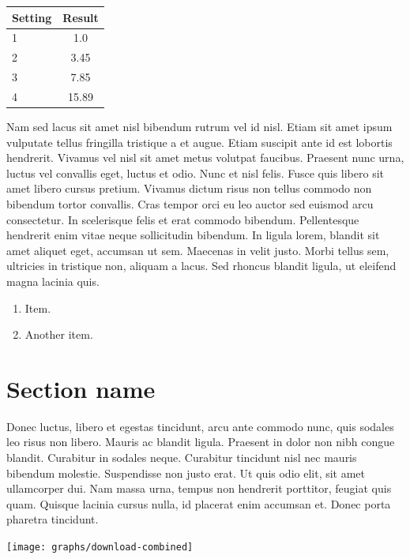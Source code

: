 \documentclass[11pt]{article}
\begin{document}
\vspace{0.5cm}
\begin{tabular}{lc}
  \toprule
  Setting & Result\\
  \midrule
  1 & 1.0\\
  2 & 3.45\\
  3 & 7.85\\
  4 & 15.89\\
  \bottomrule
\end{tabular}
\vspace{0.5cm}

Nam sed lacus sit amet nisl bibendum rutrum vel id nisl. Etiam sit
amet ipsum vulputate tellus fringilla tristique a et augue. Etiam
suscipit ante id est lobortis hendrerit. Vivamus vel nisl sit amet
metus volutpat faucibus. Praesent nunc urna, luctus vel convallis
eget, luctus et odio. Nunc et nisl felis. Fusce quis libero sit amet
libero cursus pretium. Vivamus dictum risus non tellus commodo non
bibendum tortor convallis. Cras tempor orci eu leo auctor sed euismod
arcu consectetur. In scelerisque felis et erat commodo
bibendum. Pellentesque hendrerit enim vitae neque sollicitudin
bibendum. In ligula lorem, blandit sit amet aliquet eget, accumsan ut
sem. Maecenas in velit justo. Morbi tellus sem, ultricies in tristique
non, aliquam a lacus. Sed rhoncus blandit ligula, ut eleifend magna
lacinia quis.

\begin{enumerate}

\item Item.

\item Another item.

\end{enumerate}

\section{Section name}

Donec luctus, libero et egestas tincidunt, arcu ante commodo nunc,
quis sodales leo risus non libero. Mauris ac blandit ligula. Praesent
in dolor non nibh congue blandit. Curabitur in sodales
neque. Curabitur tincidunt nisl nec mauris bibendum
molestie. Suspendisse non justo erat. Ut quis odio elit, sit amet
ullamcorper dui. Nam massa urna, tempus non hendrerit porttitor,
feugiat quis quam. Quisque lacinia cursus nulla, id placerat enim
accumsan et. Donec porta pharetra tincidunt.

\texttt{[image: graphs/download-combined]}
\end{document}
